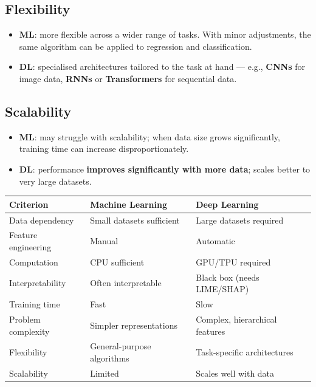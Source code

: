 \documentclass[11pt,a4paper]{article}
\theoremstyle{definition}
\theoremstyle{plain}
\theoremstyle{remark}
\begin{document}
\subsection{Flexibility}

\begin{itemize}
    \item \textbf{ML}: more flexible across a wider range of tasks. With minor adjustments, the same algorithm can be applied to regression and classification.
    \item \textbf{DL}: specialised architectures tailored to the task at hand --- e.g., \textbf{CNNs} for image data, \textbf{RNNs} or \textbf{Transformers} for sequential data.
\end{itemize}

\subsection{Scalability}

\begin{itemize}
    \item \textbf{ML}: may struggle with scalability; when data size grows significantly, training time can increase disproportionately.
    \item \textbf{DL}: performance \textbf{improves significantly with more data}; scales better to very large datasets.
\end{itemize}

\begin{tcolorbox}[colback=blue!5!white,colframe=blue!75!black,title=\textbf{ML vs DL --- Full Comparison}]
\renewcommand{\arraystretch}{1.4}
\begin{center}
\begin{tabular}{|l|p{5.2cm}|p{5.2cm}|}
\hline
\textbf{Criterion} & \textbf{Machine Learning} & \textbf{Deep Learning} \\
\hline
Data dependency & Small datasets sufficient & Large datasets required \\
\hline
Feature engineering & Manual & Automatic \\
\hline
Computation & CPU sufficient & GPU/TPU required \\
\hline
Interpretability & Often interpretable & Black box (needs LIME/SHAP) \\
\hline
Training time & Fast & Slow \\
\hline
Problem complexity & Simpler representations & Complex, hierarchical features \\
\hline
Flexibility & General-purpose algorithms & Task-specific architectures \\
\hline
Scalability & Limited & Scales well with data \\
\hline
\end{tabular}
\end{center}
\end{tcolorbox}
\end{document}
